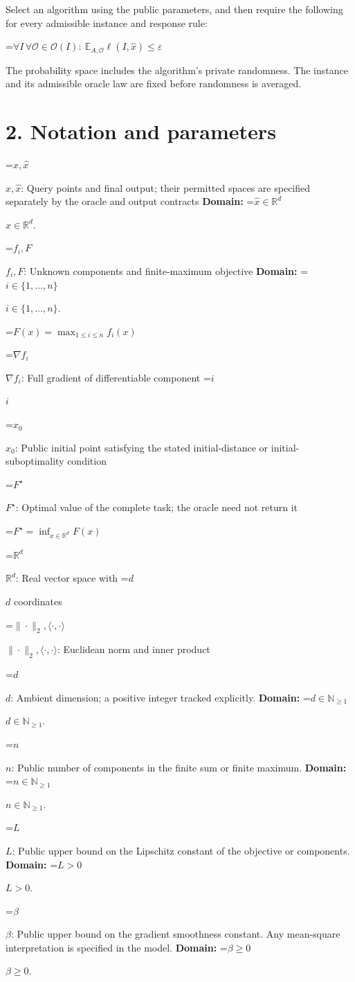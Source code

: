 \documentclass[10pt,a4paper]{article}
\newcommand{\AtlasMath}[1]{\par\begingroup\centering\setbox0=\hbox{$\displaystyle #1$}\ifdim\wd0>1.4\linewidth\typeout{ATLAS WIDE FORMULA: \the\wd0}\fi\ifdim\wd0>\linewidth\resizebox{\linewidth}{!}{\box0}\else\box0\fi\par\endgroup}
\newcommand{\AtlasInlineMath}[1]{\begingroup\setbox0=\hbox{$#1$}\ifdim\wd0>.4\linewidth\endgroup\AtlasMath{#1}\else\endgroup$#1$\fi}
\begin{document}
Select an algorithm using the public parameters, and then require the following for every admissible instance and response rule:


\AtlasMath{\forall I\,\forall\mathcal{O}\in\mathcal{O}(I):\ \mathbb{E}_{A,\mathcal{O}}\ell(I,\widehat{x})\le\varepsilon}


The probability space includes the algorithm's private randomness. The instance and its admissible oracle law are fixed before randomness is averaged.

\section{2. Notation and parameters}
\AtlasInlineMath{x,\widehat{x}}: Query points and final output; their permitted spaces are specified separately by the oracle and output contracts \textbf{Domain:} \AtlasInlineMath{\widehat{x}\in \mathbb{R}^d}.

\AtlasInlineMath{f_i,F}: Unknown components and finite-maximum objective \textbf{Domain:} \AtlasInlineMath{i\in\{1,\ldots,n\}}.


\AtlasMath{F(x)=\max_{1\le i\le n}f_i(x)}


\AtlasInlineMath{\nabla f_i}: Full gradient of differentiable component \AtlasInlineMath{i}

\AtlasInlineMath{x_0}: Public initial point satisfying the stated initial-distance or initial-suboptimality condition

\AtlasInlineMath{F^\star}: Optimal value of the complete task; the oracle need not return it


\AtlasMath{F^\star=\inf_{x\in \mathbb{R}^d}F(x)}


\AtlasInlineMath{\mathbb{R}^d}: Real vector space with \AtlasInlineMath{d} coordinates

\AtlasInlineMath{\|\cdot\|_2,\langle\cdot,\cdot\rangle}: Euclidean norm and inner product

\AtlasInlineMath{d}: Ambient dimension; a positive integer tracked explicitly. \textbf{Domain:} \AtlasInlineMath{d\in\mathbb{N}_{\ge1}}.

\AtlasInlineMath{n}: Public number of components in the finite sum or finite maximum. \textbf{Domain:} \AtlasInlineMath{n\in\mathbb{N}_{\ge1}}.

\AtlasInlineMath{L}: Public upper bound on the Lipschitz constant of the objective or components. \textbf{Domain:} \AtlasInlineMath{L>0}.

\AtlasInlineMath{\beta}: Public upper bound on the gradient smoothness constant. Any mean-square interpretation is specified in the model. \textbf{Domain:} \AtlasInlineMath{\beta\ge0}.
\end{document}
